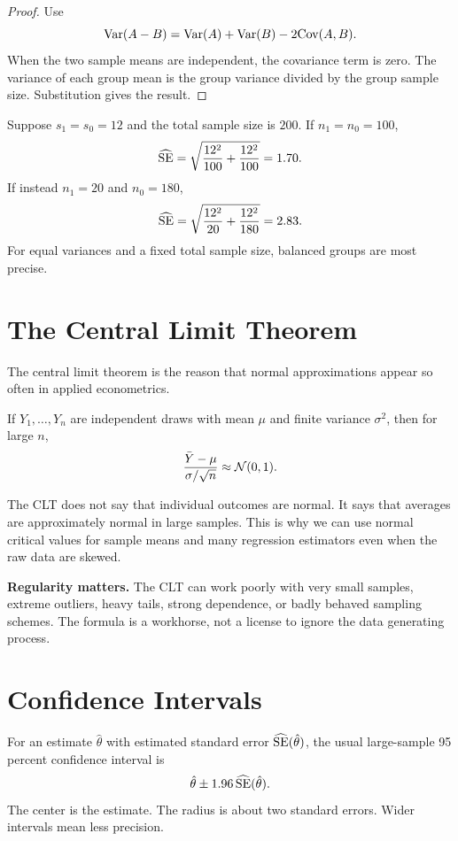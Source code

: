 \begin{proof}
Use
\[
  \mathrm{Var}(A-B)=\mathrm{Var}(A)+\mathrm{Var}(B)-2\mathrm{Cov}(A,B).
\]
When the two sample means are independent, the covariance term is zero. The
variance of each group mean is the group variance divided by the group sample
size. Substitution gives the result.
\end{proof}

\begin{exmp}
Suppose $s_1=s_0=12$ and the total sample size is $200$. If $n_1=n_0=100$,
\[
  \widehat{\mathrm{SE}}
  =
  \sqrt{\frac{12^2}{100}+\frac{12^2}{100}}
  =
  1.70.
\]
If instead $n_1=20$ and $n_0=180$,
\[
  \widehat{\mathrm{SE}}
  =
  \sqrt{\frac{12^2}{20}+\frac{12^2}{180}}
  =
  2.83.
\]
For equal variances and a fixed total sample size, balanced groups are most
precise.
\end{exmp}

\section{The Central Limit Theorem}

The central limit theorem is the reason that normal approximations appear so
often in applied econometrics.

\begin{thmN}
If $Y_1,\ldots,Y_n$ are independent draws with mean $\mu$ and finite variance
$\sigma^2$, then for large $n$,
\[
  \frac{\bar{Y}-\mu}{\sigma/\sqrt{n}}
  \approx
  \mathcal{N}(0,1).
\]
\end{thmN}

The CLT does not say that individual outcomes are normal. It says that averages
are approximately normal in large samples. This is why we can use normal
critical values for sample means and many regression estimators even when the
raw data are skewed.

\begin{boxF}
\textbf{Regularity matters.} The CLT can work poorly with very small samples,
extreme outliers, heavy tails, strong dependence, or badly behaved sampling
schemes. The formula is a workhorse, not a license to ignore the data
generating process.
\end{boxF}

\section{Confidence Intervals}

For an estimate $\hat{\theta}$ with estimated standard error
$\widehat{\mathrm{SE}}(\hat{\theta})$, the usual large-sample 95 percent confidence
interval is
\[
  \hat{\theta}
  \pm
  1.96\,\widehat{\mathrm{SE}}(\hat{\theta}).
\]
The center is the estimate. The radius is about two standard errors. Wider
intervals mean less precision.

